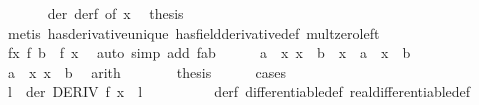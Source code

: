 \begin{isabellebody}
\ \ \ \ \isamarkupfalse%
\ {}\ der\ derf\ {\isacharbrackleft}{\kern0pt}of\ x{\isacharbrackright}{\kern0pt}\ \isamarkupfalse%
\ {\isacharquery}{\kern0pt}thesis\isanewline
\ \ \ \ \ \ \isamarkupfalse%
\ {\isacharparenleft}{\kern0pt}metis\ has{\isacharunderscore}{\kern0pt}derivative{\isacharunderscore}{\kern0pt}unique\ has{\isacharunderscore}{\kern0pt}field{\isacharunderscore}{\kern0pt}derivative{\isacharunderscore}{\kern0pt}def\ mult{\isacharunderscore}{\kern0pt}zero{\isacharunderscore}{\kern0pt}left{\isacharparenright}{\kern0pt}\isanewline
\ \ \isamarkupfalse%
\isanewline
\ \ \ \ \isamarkupfalse%
\ {}\isanewline
\ \ \ \ \isamarkupfalse%
\ \isamarkupfalse%
\ fx{\isacharcolon}{\kern0pt}\ {\isachardoublequoteopen}f\ b\ {\isacharequal}{\kern0pt}\ f\ x{\isachardoublequoteclose}\ \isamarkupfalse%
\ {\isacharparenleft}{\kern0pt}auto\ simp\ add{\isacharcolon}{\kern0pt}\ fab{\isacharparenright}{\kern0pt}\isanewline
\ \ \ \ \isamarkupfalse%
\ {\isachardoublequoteopen}a\ {\isacharless}{\kern0pt}\ x{\isacharprime}{\kern0pt}{\isachardoublequoteclose}\ {\isachardoublequoteopen}x{\isacharprime}{\kern0pt}\ {\isacharless}{\kern0pt}\ b{\isachardoublequoteclose}\ {\isacharbar}{\kern0pt}\ {\isachardoublequoteopen}x{\isacharprime}{\kern0pt}\ {\isacharequal}{\kern0pt}\ a\ {\isasymor}\ x{\isacharprime}{\kern0pt}\ {\isacharequal}{\kern0pt}\ b{\isachardoublequoteclose}\isanewline
\ \ \ \ \ \ \isamarkupfalse%
\ {\isacartoucheopen}a\ {\isasymle}\ x{\isacharprime}{\kern0pt}{\isacartoucheclose}\ {\isacartoucheopen}x{\isacharprime}{\kern0pt}\ {\isasymle}\ b{\isacartoucheclose}\ \isamarkupfalse%
\ arith\isanewline
\ \ \ \ \isamarkupfalse%
\ \isamarkupfalse%
\ {\isacharquery}{\kern0pt}thesis\isanewline
\ \ \ \ \isamarkupfalse%
\ cases\isanewline
\ \ \ \ \ \ \isamarkupfalse%
\ {}\isanewline
\ \ \ \ \ \ \ \ %
\isanewline
\ \ \ \ \ \ \isamarkupfalse%
\ \isamarkupfalse%
\ l\ \ der{\isacharcolon}{\kern0pt}\ {\isachardoublequoteopen}DERIV\ f\ x{\isacharprime}{\kern0pt}\ {\isacharcolon}{\kern0pt}{\isachargreater}{\kern0pt}\ l{\isachardoublequoteclose}\isanewline
\ \ \ \ \ \ \ \ \isamarkupfalse%
\ derf\ differentiable{\isacharunderscore}{\kern0pt}def\ real{\isacharunderscore}{\kern0pt}differentiable{\isacharunderscore}{\kern0pt}def\ \isamarkupfalse%

\end{isabellebody}
